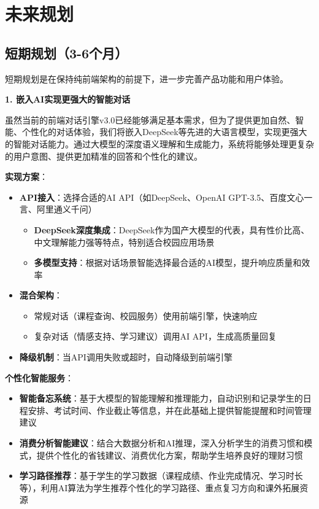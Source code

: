 \documentclass[12pt,a4paper]{article}
\begin{document}
\section{未来规划}

\subsection{短期规划（3-6个月）}

短期规划是在保持纯前端架构的前提下，进一步完善产品功能和用户体验。

\textbf{1. 嵌入AI实现更强大的智能对话}

虽然当前的前端对话引擎v3.0已经能够满足基本需求，但为了提供更加自然、智能、个性化的对话体验，我们将嵌入DeepSeek等先进的大语言模型，实现更强大的智能对话能力。通过大模型的深度语义理解和生成能力，系统将能够处理更复杂的用户意图、提供更加精准的回答和个性化的建议。

\textbf{实现方案}：
\begin{itemize}
    \item \textbf{API接入}：选择合适的AI API（如DeepSeek、OpenAI GPT-3.5、百度文心一言、阿里通义千问）
        \begin{itemize}
            \item \textbf{DeepSeek深度集成}：DeepSeek作为国产大模型的代表，具有性价比高、中文理解能力强等特点，特别适合校园应用场景
            \item \textbf{多模型支持}：根据对话场景智能选择最合适的AI模型，提升响应质量和效率
        \end{itemize}
    \item \textbf{混合架构}：
        \begin{itemize}
            \item 常规对话（课程查询、校园服务）使用前端引擎，快速响应
            \item 复杂对话（情感支持、学习建议）调用AI API，生成高质量回复
        \end{itemize}
    \item \textbf{降级机制}：当API调用失败或超时，自动降级到前端引擎
\end{itemize}

\textbf{个性化智能服务}：
\begin{itemize}
    \item \textbf{智能备忘系统}：基于大模型的智能理解和推理能力，自动识别和记录学生的日程安排、考试时间、作业截止等信息，并在此基础上提供智能提醒和时间管理建议
    \item \textbf{消费分析智能建议}：结合大数据分析和AI推理，深入分析学生的消费习惯和模式，提供个性化的省钱建议、消费优化方案，帮助学生培养良好的理财习惯
    \item \textbf{学习路径推荐}：基于学生的学习数据（课程成绩、作业完成情况、学习时长等），利用AI算法为学生推荐个性化的学习路径、重点复习方向和课外拓展资源
\end{itemize}
\end{document}
